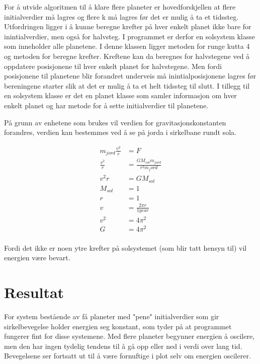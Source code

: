 \documentclass[a4paper, 12pt]{article}
\begin{document}
 For å utvide algoritmen til å klare flere planeter er hovedforskjellen at flere initialverdier må lagres og flere k må lagres   før det er mulig å ta et tidssteg. Utfordringen ligger i å kunne beregne krefter på hver enkelt planet ikke bare for inintialverdier, men også for halvsteg. I programmet er derfor en solsystem klasse som inneholder alle planetene. I denne klassen ligger metoden for runge kutta 4 og metoden for beregne krefter. Kreftene kan da beregnes for halvstegene ved å oppdatere posisjonene til hver enkelt planet for halvstegene. Men fordi posisjonene til planetene blir forandret underveis må inintialposisjonene lagres før bereningene starter slik at det er mulig å ta et helt tidssteg til slutt. I tillegg til en solsystem klasse er det en planet klasse som samler informasjon om hver enkelt planet og har metode for å sette initialverdier til planetene.
 
 
 På grunn av enhetene som brukes vil verdien for gravitasjonskonstanten forandres, verdien kan bestemmes ved å se på jorda i sirkelbane rundt sola.

 
\begin{equation}
 \label{eq:gravityconstant}
 	\begin{aligned}
 	m_{jord}\frac{v^2}{r} &= F\\
 	\frac{v^2}{r} &= \frac{GM_{sol}m_{jord}}{r^2m_jord}\\
 	v^2r &= GM_{sol}\\
 	M_{sol} &= 1\\
 	r	&= 1\\
 	v &= \frac{2\pi r}{1 year}\\
 	v^2 &= 4\pi^2\\
 	G &= 4\pi^2\\
 	\end{aligned}
\end{equation}

Fordi det ikke er noen ytre krefter på solsystemet (som blir tatt hensyn til) vil energien være bevart. 
 
 \newpage
\section*{Resultat}
For system bestående av få planeter med "pene" initialverdier som gir sirkelbevegelse holder energien seg konstant, som tyder på at programmet fungerer fint for disse systemene. Med flere planeter begynner energien å oscilere, men den har ingen tydelig tendens til å gå opp eller ned i verdi over lang tid. Bevegelsene ser fortsatt ut til å være fornuftige i plot selv om energien oscilerer. 
\end{document}
